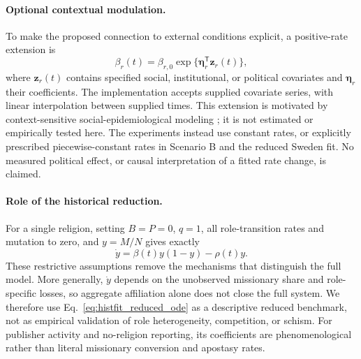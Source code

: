 \paragraph{Optional contextual modulation.}
To make the proposed connection to external conditions explicit, a positive-rate extension is
\begin{equation}
\beta_r(t)=\beta_{r,0}\exp\{\boldsymbol\eta_r^\mathsf{T}\mathbf z_r(t)\},
\label{eq:context}
\end{equation}
where $\mathbf z_r(t)$ contains specified social, institutional, or political covariates and $\boldsymbol\eta_r$ their coefficients. The implementation accepts supplied covariate series, with linear interpolation between supplied times. This extension is motivated by context-sensitive social-epidemiological modeling \cite{emit_paper}; it is not estimated or empirically tested here. The experiments instead use constant rates, or explicitly prescribed piecewise-constant rates in Scenario B and the reduced Sweden fit. No measured political effect, or causal interpretation of a fitted rate change, is claimed.

\paragraph{Role of the historical reduction.}
For a single religion, setting $B=P=0$, $q=1$, all role-transition rates and mutation to zero, and $y=M/N$ gives exactly
\begin{equation}
\dot y=\beta(t)y(1-y)-\rho(t)y.
\label{eq:histfit_reduced_ode}
\end{equation}
These restrictive assumptions remove the mechanisms that distinguish the full model. More generally, $\dot y$ depends on the unobserved missionary share and role-specific losses, so aggregate affiliation alone does not close the full system. We therefore use Eq.~\eqref{eq:histfit_reduced_ode} as a descriptive reduced benchmark, not as empirical validation of role heterogeneity, competition, or schism. For publisher activity and no-religion reporting, its coefficients are phenomenological rather than literal missionary conversion and apostasy rates.
